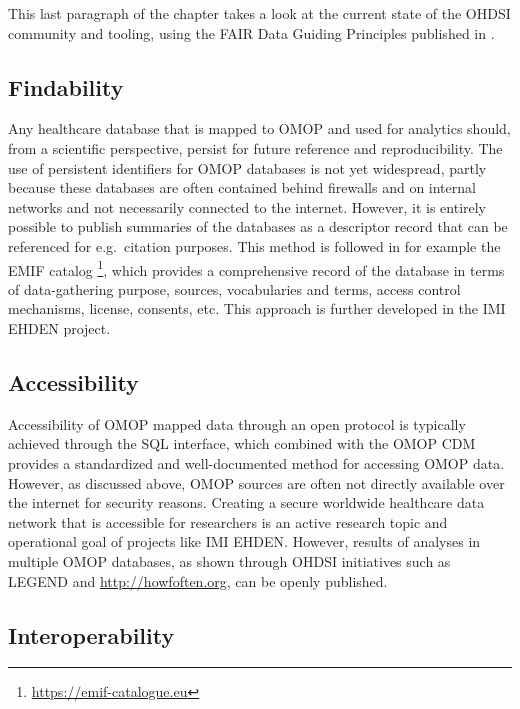\documentclass[11pt]{book}
\let\rmarkdownfootnote\footnote%
\def\footnote{\protect\rmarkdownfootnote}
\theoremstyle{definition}
\theoremstyle{definition}
\theoremstyle{definition}
\theoremstyle{remark}
\begin{document}
This last paragraph of the chapter takes a look at the current state of the OHDSI community and tooling, using the FAIR Data Guiding Principles published in \citet{wilkinson2016}.

\hypertarget{findability}{%
\subsection{Findability}\label{findability}}

Any healthcare database that is mapped to OMOP and used for analytics should, from a scientific perspective, persist for future reference and reproducibility. The use of persistent identifiers for OMOP databases is not yet widespread, partly because these databases are often contained behind firewalls and on internal networks and not necessarily connected to the internet. However, it is entirely possible to publish summaries of the databases as a descriptor record that can be referenced for e.g.~citation purposes. This method is followed in for example the EMIF catalog \footnote{\url{https://emif-catalogue.eu}}, which provides a comprehensive record of the database in terms of data-gathering purpose, sources, vocabularies and terms, access control mechanisms, license, consents, etc. \citep{Oliveira2019} This approach is further developed in the IMI EHDEN project.

\hypertarget{accessibility}{%
\subsection{Accessibility}\label{accessibility}}

Accessibility of OMOP mapped data through an open protocol is typically achieved through the SQL interface, which combined with the OMOP CDM provides a standardized and well-documented method for accessing OMOP data. However, as discussed above, OMOP sources are often not directly available over the internet for security reasons. Creating a secure worldwide healthcare data network that is accessible for researchers is an active research topic and operational goal of projects like IMI EHDEN. However, results of analyses in multiple OMOP databases, as shown through OHDSI initiatives such as LEGEND and \url{http://howfoften.org}, can be openly published.

\hypertarget{interoperability}{%
\subsection{Interoperability}\label{interoperability}}
\end{document}
